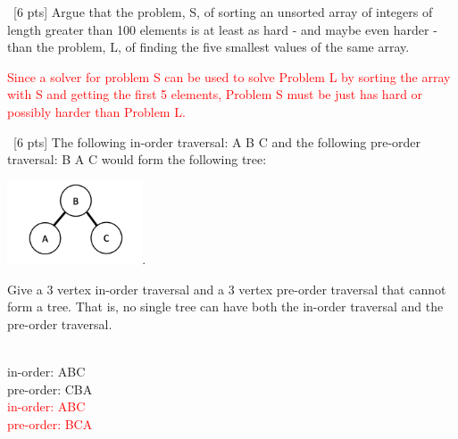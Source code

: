\documentclass[12pt]{article}
\newenvironment{sol}[1][Solution]{\begin{trivlist}\item[\hskip\labelsep {\bfseries #1:}]}{\end{trivlist}}
\begin{document}
\begin{enumerate}
\begin{enumerate}
    \end{enumerate}

    \item \ [6 pts] Argue that the problem, S, of sorting an unsorted array of integers of length greater than 100 elements is at least as hard - and maybe even harder - than the problem, L, of finding the five smallest values of the same array.
    \begin{sol}
    \textcolor{red}{Since a solver for problem S can be used to solve Problem L by sorting the array with S and getting the first 5 elements, Problem S must be just has hard or possibly harder than Problem L.}
    \end{sol}
    \item \ [6 pts] The following in-order traversal: A B C and the following pre-order traversal: B A C would form the following tree:
        \begin{center}
        \includegraphics[width=0.3\textwidth]{p1.png}.
    \end{center}
    Give a 3 vertex in-order traversal and a 3 vertex pre-order traversal that cannot form a tree. That is, no single tree can have both the in-order traversal and the pre-order traversal.
    \begin{sol}
    \hspace*{\fill}\\
    in-order: ABC\\
    pre-order: CBA\\
    \textcolor{red}{    
    in-order: ABC\\
    pre-order: BCA}
    \end{sol}


\end{enumerate}
\end{document}
